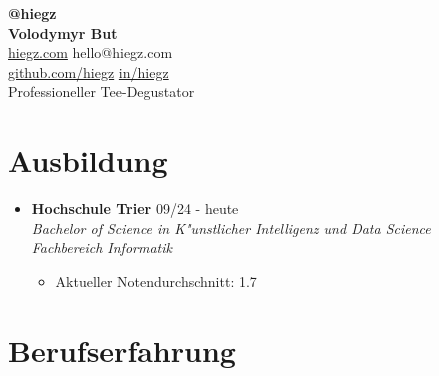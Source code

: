 \documentclass[]{article}
\begin{document}
\begin{center}
    \textbf{\Large @hiegz} \\[3pt]
    \textbf{\huge Volodymyr But} \\[7pt]

     \href{https://www.hiegz.com}{hiegz.com}
    \hspace{5pt}
     hello@hiegz.com \\[2pt]

     \href{https://github.com/hiegz}{github.com/hiegz}
    \hspace{5pt}
     \href{https://linkedin.com/in/hiegz}{in/hiegz} \\[10pt]

    Professioneller Tee-Degustator
\end{center}

\section{Ausbildung}

\begin{itemize}[leftmargin=0.15in, rightmargin=0.15in, label={}]
    \item {\large\bfseries Hochschule Trier} \hfill 09/24 - heute \\
        {\itshape Bachelor of Science in K"unstlicher Intelligenz und Data Science \\ Fachbereich Informatik}

        \begin{itemize}
            \item Aktueller Notendurchschnitt: 1.7
        \end{itemize}
\end{itemize}

\section{Berufserfahrung}
\end{document}
